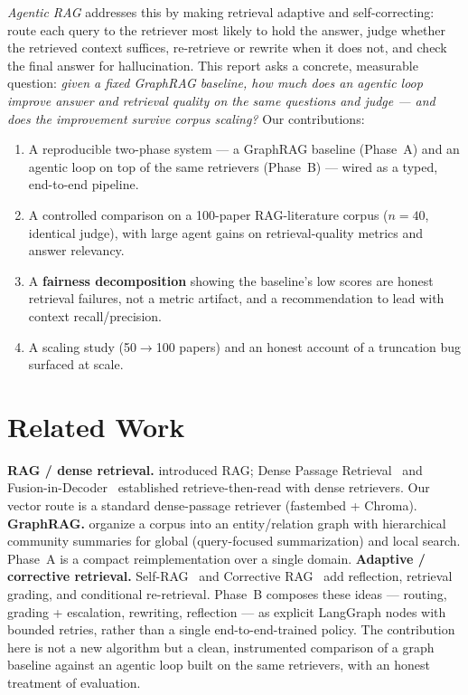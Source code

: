 \documentclass[11pt]{article}
\begin{document}
\emph{Agentic RAG} addresses this by making retrieval adaptive and self-correcting: route each query to the retriever most likely to hold the answer, judge whether the retrieved context suffices, re-retrieve or rewrite when it does not, and check the final answer for hallucination. This report asks a concrete, measurable question: \emph{given a fixed GraphRAG baseline, how much does an agentic loop improve answer and retrieval quality on the same questions and judge --- and does the improvement survive corpus scaling?} Our contributions:
\begin{enumerate}
  \item A reproducible two-phase system --- a GraphRAG baseline (Phase~A) and an agentic loop on top of the same retrievers (Phase~B) --- wired as a typed, end-to-end pipeline.
  \item A controlled comparison on a 100-paper RAG-literature corpus ($n{=}40$, identical judge), with large agent gains on retrieval-quality metrics and answer relevancy.
  \item A \textbf{fairness decomposition} showing the baseline's low scores are honest retrieval failures, not a metric artifact, and a recommendation to lead with context recall/precision.
  \item A scaling study (50$\to$100 papers) and an honest account of a truncation bug surfaced at scale.
\end{enumerate}

\section{Related Work}
\textbf{RAG / dense retrieval.} \citet{lewis2020rag} introduced RAG; Dense Passage Retrieval~\citep{karpukhin2020dpr} and Fusion-in-Decoder~\citep{izacard2021fid} established retrieve-then-read with dense retrievers. Our vector route is a standard dense-passage retriever (fastembed + Chroma).
\textbf{GraphRAG.} \citet{edge2024graphrag} organize a corpus into an entity/relation graph with hierarchical community summaries for global (query-focused summarization) and local search. Phase~A is a compact reimplementation over a single domain.
\textbf{Adaptive / corrective retrieval.} Self-RAG~\citep{asai2024selfrag} and Corrective RAG~\citep{yan2024crag} add reflection, retrieval grading, and conditional re-retrieval. Phase~B composes these ideas --- routing, grading + escalation, rewriting, reflection --- as explicit LangGraph nodes with bounded retries, rather than a single end-to-end-trained policy. The contribution here is not a new algorithm but a clean, instrumented comparison of a graph baseline against an agentic loop built on the same retrievers, with an honest treatment of evaluation.
\end{document}
